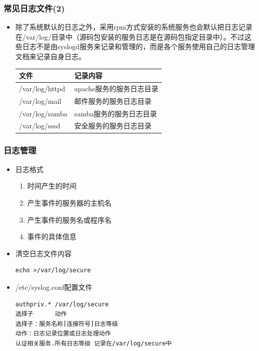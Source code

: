 \documentclass[xcolor=svgnames,presentation]{beamer}
\begin{document}
\begin{frame}
\frametitle{常见日志文件(2)}
\label{sec-6-3}
\begin{itemize}

\item 除了系统默认的日志之外，采用rpm方式安装的系统服务也会默认把日志记录在/var/log/目录中（源码包安装的服务日志是在源码包指定目录中）。不过这些日志不是由syslogd服务来记录和管理的，而是各个服务使用自己的日志管理文档来记录自身日志。\\
\label{sec-6-3-1}%
\begin{center}
\begin{tabular}{ll}
 文件            &  记录内容                  \\
\hline
 /var/log/httpd  &  apache服务的服务日志目录  \\
 /var/log/mail   &  邮件服务的服务日志目录    \\
 /var/log/samba  &  samba服务的服务日志目录   \\
 /var/log/sssd   &  安全服务的服务日志目录    \\
\end{tabular}
\end{center}


\end{itemize} %
\end{frame}
\begin{frame}[fragile]
\frametitle{日志管理}
\label{sec-6-4}
\begin{itemize}

\item 日志格式
\label{sec-6-4-1}%
\begin{enumerate}
\item 时间产生的时间
\item 产生事件的服务器的主机名
\item 产生事件的服务名或程序名
\item 事件的具体信息
\end{enumerate}

\item 清空日志文件内容\\
\label{sec-6-4-2}%
\begin{verbatim}
echo >/var/log/secure
\end{verbatim}

\item /etc/syslog.conf配置文件\\
\label{sec-6-4-3}%
\begin{verbatim}
authpriv.* /var/log/secure
选择子      动作
选择子：服务名称[连接符号]日志等级
动作：日志记录位置或日志处理动作
认证相关服务.所有日志等级 记录在/var/log/secure中
\end{verbatim}
\end{itemize} %
\end{frame}
\end{document}
